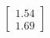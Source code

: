 \documentclass[preview]{standalone}
\begin{document}
\begin{align*}
\begin{bmatrix} 1.54 \\ 1.69 \end{bmatrix}
\end{align*}
\end{document}
